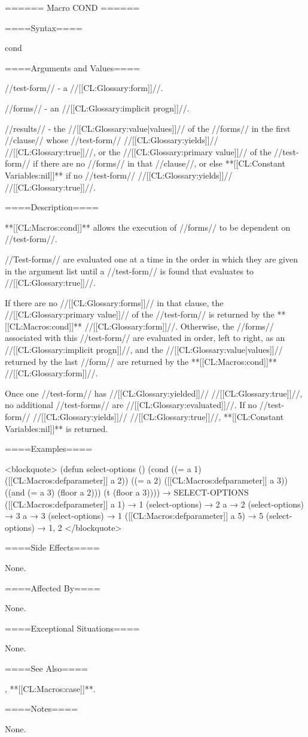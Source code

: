 ====== Macro COND ======

====Syntax====

\DefmacWithValues cond {} {}


====Arguments and Values====

//test-form// - a //[[CL:Glossary:form]]//.

//forms// - an //[[CL:Glossary:implicit progn]]//.

//results// - the //[[CL:Glossary:value|values]]// of the //forms// in the first //clause// whose //test-form// //[[CL:Glossary:yields]]// //[[CL:Glossary:true]]//, or the //[[CL:Glossary:primary value]]// of the //test-form// if there are no //forms// in that //clause//, or else **[[CL:Constant Variables:nil]]** if no //test-form// //[[CL:Glossary:yields]]// //[[CL:Glossary:true]]//.

====Description====

**[[CL:Macros:cond]]** allows the execution of //forms// to be dependent on //test-form//.

//Test-forms// are evaluated one at a time in the order in which they are given in the argument list until a //test-form// is found that evaluates to //[[CL:Glossary:true]]//.

If there are no //[[CL:Glossary:forms]]// in that clause, the //[[CL:Glossary:primary value]]// of the //test-form// is returned by the **[[CL:Macros:cond]]** //[[CL:Glossary:form]]//. Otherwise, the //forms// associated with this //test-form// are evaluated in order, left to right, as an //[[CL:Glossary:implicit progn]]//, and the //[[CL:Glossary:value|values]]// returned by the last //form// are returned by the **[[CL:Macros:cond]]** //[[CL:Glossary:form]]//.

Once one //test-form// has //[[CL:Glossary:yielded]]// //[[CL:Glossary:true]]//, no additional //test-forms// are //[[CL:Glossary:evaluated]]//. If no //test-form// //[[CL:Glossary:yields]]// //[[CL:Glossary:true]]//, **[[CL:Constant Variables:nil]]** is returned.

====Examples====

<blockquote> (defun select-options () (cond ((= a 1) ([[CL:Macros:defparameter]] a 2)) ((= a 2) ([[CL:Macros:defparameter]] a 3)) ((and (= a 3) (floor a 2))) (t (floor a 3)))) → SELECT-OPTIONS ([[CL:Macros:defparameter]] a 1) → 1 (select-options) → 2 a → 2 (select-options) → 3 a → 3 (select-options) → 1 ([[CL:Macros:defparameter]] a 5) → 5 (select-options) → 1, 2 </blockquote>

====Side Effects====

None.

====Affected By====

None.

====Exceptional Situations====

None.

====See Also====

, **[[CL:Macros:case]]**.

====Notes====

None.



